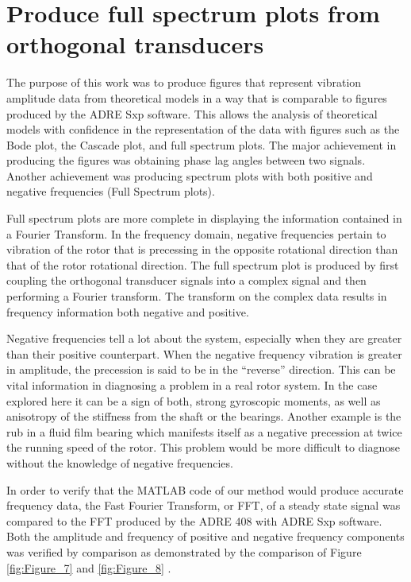 	\section{Produce full spectrum plots from orthogonal transducers }
		The purpose of this work was to produce figures that represent vibration amplitude data from theoretical models in a way that is comparable to figures produced by the ADRE Sxp software. This allows the analysis of theoretical models with confidence in the representation of the data with figures such as the Bode plot, the Cascade plot, and full spectrum plots. The major achievement in producing the figures was obtaining phase lag angles between two signals. Another achievement was producing spectrum plots with both positive and negative frequencies (Full Spectrum plots).\par 
		Full spectrum plots are more complete in displaying the information contained in a Fourier Transform. In the frequency domain, negative frequencies pertain to vibration of the rotor that is precessing in the opposite rotational direction than that of the rotor rotational direction. The full spectrum plot is produced by first coupling the orthogonal transducer signals into a complex signal and then performing a Fourier transform. The transform on the complex data results in frequency information both negative and positive.\par 
		Negative frequencies tell a lot about the system, especially when they are greater than their positive counterpart. When the negative frequency vibration is greater in amplitude, the precession is said to be in the “reverse” direction. This can be vital information in diagnosing a problem in a real rotor system. In the case explored here it can be a sign of both, strong gyroscopic moments, as well as anisotropy of the stiffness from the shaft or the bearings. Another example is the rub in a fluid film bearing which manifests itself as a negative precession at twice the running speed of the rotor. This problem would be more difficult to diagnose without the knowledge of negative frequencies.\par 
		In order to verify that the MATLAB code of our method would produce accurate frequency data, the Fast Fourier Transform, or FFT, of a steady state signal was compared to the FFT produced by the ADRE 408 with ADRE Sxp software. Both the amplitude and frequency of positive and negative frequency components was verified by comparison as demonstrated by the comparison of Figure \ref{fig:Figure_7}  and \ref{fig:Figure_8} .\par 
